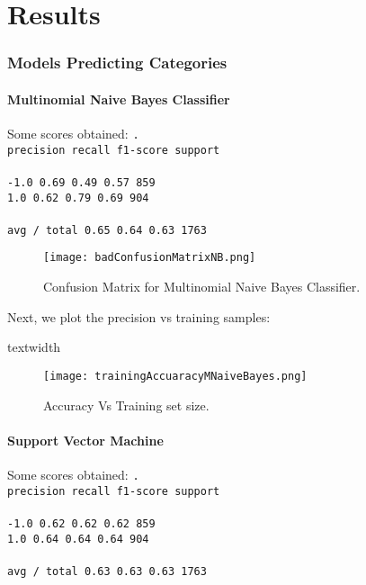 
\chapter{Results}
\label{ch:results}

\subsection{Models Predicting Categories}
\subsubsection{Multinomial Naive Bayes Classifier}
Some scores obtained:
\texttt{.\\
             precision    recall  f1-score   support \\
\\
       -1.0       0.69      0.49      0.57       859\\
        1.0       0.62      0.79      0.69       904\\
\\
avg / total       0.65      0.64      0.63      1763\\
}

\begin{figure}[h]
	\label{fig:nbConfusion}
	\texttt{[image: badConfusionMatrixNB.png]}
    \caption{Confusion Matrix for Multinomial Naive Bayes Classifier.}
\end{figure}

Next, we plot the precision vs training samples:

textwidth%
\begin{figure}[h]
	\label{fig:partialResults1}
	\texttt{[image: trainingAccuaracyMNaiveBayes.png]}
    \caption{Accuracy Vs Training set size.}
\end{figure}


\subsubsection{Support Vector Machine}
Some scores obtained:
\texttt{.\\
     precision    recall  f1-score   support\\
\\
       -1.0       0.62      0.62      0.62       859\\
        1.0       0.64      0.64      0.64       904\\
\\
avg / total       0.63      0.63      0.63      1763\\
}

